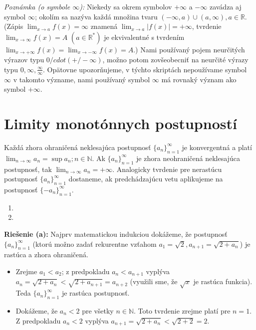 \textit{Poznámka (o symbole $\infty$):}
Niekedy sa okrem symbolov $+\infty$ a $-\infty$ zavádza aj symbol $\infty$; okolím sa nazýva každá množina tvaru $(-\infty,a)\cup (a,\infty), a \in \mathbb{R}$. (Zápis $\lim_{x \rightarrow a}f(x)=\infty$ znamená $\lim_{x \rightarrow a}|f(x)|=+\infty$, tvrdenie $\lim_{x \rightarrow \infty} f(x)=A$   $(a \in \mathbb{R^*})$ je ekvivalentné s tvrdením $\lim_{x \rightarrow +\infty}f(x)=\lim_{x \rightarrow -\infty}f(x)=A$.) Nami používaný pojem neurčitých výrazov typu $0 /cdot (+/- \infty)$, možno potom zovšeobecniť na neurčité výrazy typu $0, \infty, \frac{\infty}{\infty}$. Opätovne upozorňujeme, v týchto skriptách nepoužívame symbol $\infty$ v takomto význame, nami používaný symbol $\infty$ má rovnaký význam ako symbol $+\infty$.

\section{Limity monotónnych postupností}
\begin{veta}
Každá zhora ohraničená neklesajúca postupnosť ${\{a_n\}}_{n=1}^\infty$ je konvergentná a platí $\lim_{n \rightarrow \infty} a_n=\sup {a_n;n \in \mathbb{N}}$.
Ak ${\{a_n\}}_{n=1}^\infty$ je zhora neohraničená neklesajúca postupnosť, tak $\lim_{n \rightarrow \infty} a_n=+\infty$.
Analogicky tvrdenie pre nerastúcu postupnosť ${\{a_n\}}_{n=1}^\infty$  dostaneme, ak predchádzajúcu vetu aplikujeme na postupnosť ${\{-a_n\}}_{n=1}^\infty$. 
\end{veta}

\begin{enumerate}[resume]
	\item {}
	\item {}
\end{enumerate}

\textbf{Riešenie (a):}
Najprv matematickou indukciou dokážeme, že postupnosť ${\{a_n\}}_{n=1}^\infty$ (ktorú možno zadať rekurentne vzťahom $a_1=\sqrt{2},a_{n+1}=\sqrt{2+a_n}$) je rastúca a zhora ohraničená. 
\begin{itemize}
\item Zrejme $a_1<a_2$; z predpokladu $a_n<a_{n+1}$ vyplýva $a_n=\sqrt{2+a_n}<\sqrt{2+a_{n+1}}=a_{n+2}$ (využili sme, že $\sqrt{x}$ je rastúca funkcia). Teda ${\{a_n\}}_{n=1}^\infty$ je rastúca postupnosť.
\item Dokážeme, že $a_n<2$ pre všetky $n \in \mathbb{N}$. Toto tvrdenie zrejme platí pre $n=1$. Z predpokladu $a_n<2$ vyplýva $a_{n+1}=\sqrt{2+a_{n}}<\sqrt{2+2}=2$.
\end{itemize}

